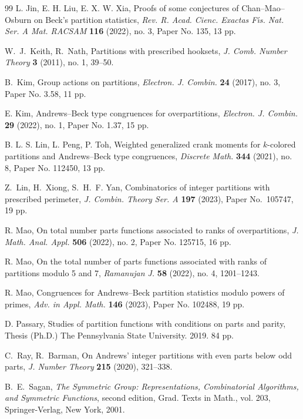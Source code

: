 \documentclass[12pt,reqno]{amsart}
\numberwithin{equation}{section}
\theoremstyle{plain}
\theoremstyle{definition}
\begin{document}
\begin{thebibliography}{99}
L. Jin, E. H. Liu, E. X. W. Xia,
Proofs of some conjectures of Chan--Mao--Osburn on Beck's partition statistics,
\textit{Rev. R. Acad. Cienc. Exactas F\'{\i}s. Nat. Ser. A Mat. RACSAM}
\textbf{116} (2022), no. 3, Paper No. 135, 13 pp.


W.~J.~Keith, R.~Nath,
Partitions with prescribed hooksets,
\textit{J. Comb. Number Theory} \textbf{3} (2011), no. 1, 39--50.


B.~Kim, Group actions on partitions,
\textit{Electron. J. Combin.} \textbf{24} (2017), no. 3, Paper No. 3.58, 11 pp.


E. Kim,
Andrews--Beck type congruences for overpartitions,
\textit{Electron. J. Combin.} \textbf{29} (2022), no. 1, Paper No. 1.37, 15 pp.


B. L. S. Lin, L. Peng, P. Toh,
Weighted generalized crank moments for $k$-colored partitions and Andrews--Beck type congruences,
\textit{Discrete Math.} \textbf{344} (2021), no. 8, Paper No. 112450, 13 pp.


Z.~Lin, H.~Xiong, S.~H.~F. Yan, Combinatorics of integer partitions with prescribed perimeter,
\textit{J. Combin. Theory Ser. A} \textbf{197} (2023), Paper No.~105747, 19 pp.


R. Mao,
On total number parts functions associated to ranks of overpartitions,
\textit{J. Math. Anal. Appl.} \textbf{506} (2022), no. 2, Paper No. 125715, 16 pp.


R. Mao,
On the total number of parts functions associated with ranks of partitions modulo 5 and 7,
\textit{Ramanujan J.} \textbf{58} (2022), no. 4, 1201--1243.


R. Mao,
Congruences for Andrews--Beck partition statistics modulo powers of primes,
\textit{Adv. in Appl. Math.} \textbf{146} (2023), Paper No. 102488, 19 pp.


D. Passary, Studies of partition functions with conditions on parts and parity,
Thesis (Ph.D.) The Pennsylvania State University. 2019. 84 pp.


C.~Ray, R.~Barman,
On Andrews' integer partitions with even parts below odd parts,
\textit{J. Number Theory} \textbf{215} (2020), 321--338.


B.~E.~Sagan,
\textit{The Symmetric Group: Representations, Combinatorial Algorithms, and Symmetric Functions},
second edition, Grad. Texts in Math., vol. 203, Springer-Verlag, New York, 2001.



\end{thebibliography}
\end{document}
